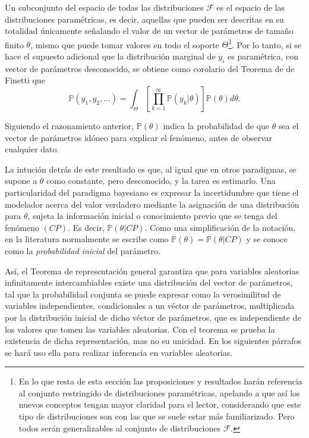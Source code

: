 Un subconjunto del espacio de todas las distribuciones $\mathcal{F}$ es el espacio de las distribuciones param\'etricas, es decir, aquellas que pueden ser descritas en su totalidad \'unicamente señalando el valor de un vector de par\'ametros de tamaño finito $\theta$, mismo que puede tomar valores en todo el soporte $\Theta$\footnote{En lo que resta de esta secci\'on las proposiciones y resultados har\'an referencia al conjunto restringido de distribuciones param\'etricas, apelando a que as\'i los nuevos conceptos tengan mayor claridad para el lector, considerando que este tipo de distribuciones son con las que se suele estar m\'as familiarizado. Pero todos ser\'an generalizables al conjunto de distribuciones $\mathcal{F}$.}. Por lo tanto, si se hace el supuesto adicional que la distribuci\'on marginal de $y_i$ es param\'etrica, con vector de par\'ametros desconocido, se obtiene como corolario del Teorema de de Finetti que
\begin{equation*}
    \mathbb{P}(y_1,y_2,\ldots) =
    \int_{\Theta}\left[\prod_{k=1}^\infty \mathbb{P}(y_k|\theta)\right]\mathbb{P}(\theta)d\theta.
\end{equation*}

Siguiendo el razonamiento anterior, $\mathbb{P}(\theta)$ indica la probabilidad de que $\theta$ sea el vector de par\'ametros id\'oneo para explicar el fen\'omeno, antes de observar cualquier dato.

La intuci\'on detr\'as de este resultado es que, al igual que en otros paradigmas, se supone a $\theta$ como constante, pero desconocido, y la tarea es estimarlo. Una particularidad del paradigma bayesiano es expresar la incertidumbre que tiene el modelador acerca del valor verdadero mediante la asignaci\'on de una distribuci\'on para $\theta$, sujeta la informaci\'on inicial o conocimiento previo que se tenga del fen\'omeno $(CP)$. Es decir, $\mathbb{P}(\theta|CP)$. Como una simplificaci\'on de la notaci\'on, en la literatura normalmente se escribe como $\mathbb{P}(\theta) = \mathbb{P}(\theta|CP)$ y se conoce como la \textit{probabilidad inicial} del par\'ametro.

As\'i, el Teorema de representaci\'on general garantiza que para variables aleatorias infinitamente intercambiables existe una distribuci\'on del vector de par\'ametros, tal que la probabilidad conjunta se puede expresar como la verosimilitud de variables independientes, condicionales a un v\'ector de par\'ametros, multiplicada por la distribuci\'on inicial de dicho v\'ector de par\'ametros, que es independiente de los valores que tomen las variables aleatorias. Con el teorema se prueba la existencia de dicha representaci\'on, mas no su unicidad. En los siguientes p\'arrafos se har\'a uso ella para realizar inferencia en variables aleatorias.

